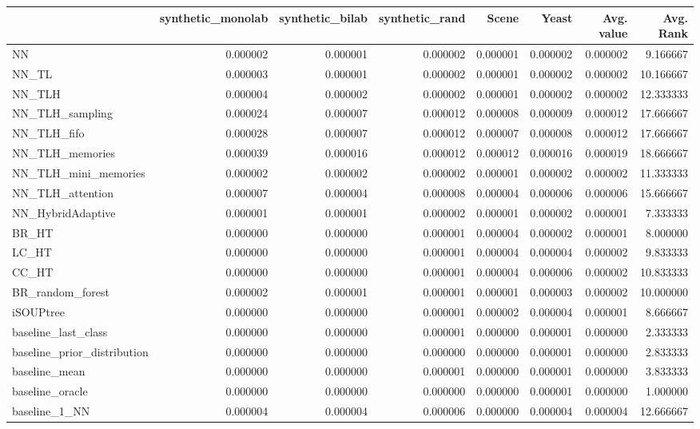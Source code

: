 \begin{tabular}{lrrrrrrr}
\toprule
 & synthetic_monolab & synthetic_bilab & synthetic_rand & Scene & Yeast & Avg. value & Avg. Rank \\
\midrule
NN & 0.000002 & 0.000001 & 0.000002 & 0.000001 & 0.000002 & 0.000002 & 9.166667 \\
NN_TL & 0.000003 & 0.000001 & 0.000002 & 0.000001 & 0.000002 & 0.000002 & 10.166667 \\
NN_TLH & 0.000004 & 0.000002 & 0.000002 & 0.000001 & 0.000002 & 0.000002 & 12.333333 \\
NN_TLH_sampling & 0.000024 & 0.000007 & 0.000012 & 0.000008 & 0.000009 & 0.000012 & 17.666667 \\
NN_TLH_fifo & 0.000028 & 0.000007 & 0.000012 & 0.000007 & 0.000008 & 0.000012 & 17.666667 \\
NN_TLH_memories & 0.000039 & 0.000016 & 0.000012 & 0.000012 & 0.000016 & 0.000019 & 18.666667 \\
NN_TLH_mini_memories & 0.000002 & 0.000002 & 0.000002 & 0.000001 & 0.000002 & 0.000002 & 11.333333 \\
NN_TLH_attention & 0.000007 & 0.000004 & 0.000008 & 0.000004 & 0.000006 & 0.000006 & 15.666667 \\
NN_HybridAdaptive & 0.000001 & 0.000001 & 0.000002 & 0.000001 & 0.000002 & 0.000001 & 7.333333 \\
BR_HT & 0.000000 & 0.000000 & 0.000001 & 0.000004 & 0.000002 & 0.000001 & 8.000000 \\
LC_HT & 0.000000 & 0.000000 & 0.000001 & 0.000004 & 0.000004 & 0.000002 & 9.833333 \\
CC_HT & 0.000000 & 0.000000 & 0.000001 & 0.000004 & 0.000006 & 0.000002 & 10.833333 \\
BR_random_forest & 0.000002 & 0.000001 & 0.000001 & 0.000001 & 0.000003 & 0.000002 & 10.000000 \\
iSOUPtree & 0.000000 & 0.000000 & 0.000001 & 0.000002 & 0.000004 & 0.000001 & 8.666667 \\
baseline_last_class & 0.000000 & 0.000000 & 0.000001 & 0.000000 & 0.000001 & 0.000000 & 2.333333 \\
baseline_prior_distribution & 0.000000 & 0.000000 & 0.000000 & 0.000000 & 0.000001 & 0.000000 & 2.833333 \\
baseline_mean & 0.000000 & 0.000000 & 0.000001 & 0.000000 & 0.000001 & 0.000000 & 3.833333 \\
baseline_oracle & 0.000000 & 0.000000 & 0.000000 & 0.000000 & 0.000001 & 0.000000 & 1.000000 \\
baseline_1_NN & 0.000004 & 0.000004 & 0.000006 & 0.000000 & 0.000004 & 0.000004 & 12.666667 \\
\bottomrule
\end{tabular}
